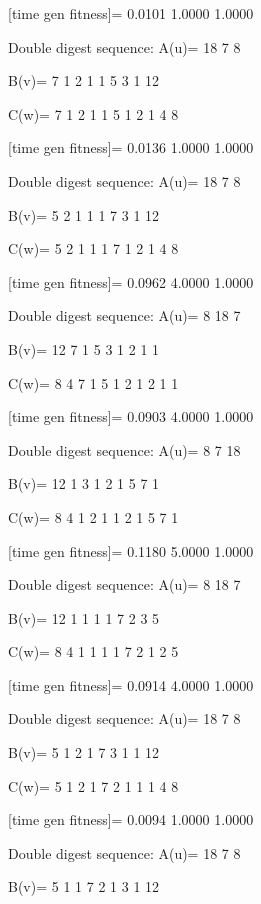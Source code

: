 [time gen fitness]=
    0.0101    1.0000    1.0000

Double digest sequence:
A(u)=
    18     7     8

B(v)=
     7     1     2     1     1     5     3     1    12

C(w)=
     7     1     2     1     1     5     1     2     1     4     8

[time gen fitness]=
    0.0136    1.0000    1.0000

Double digest sequence:
A(u)=
    18     7     8

B(v)=
     5     2     1     1     1     7     3     1    12

C(w)=
     5     2     1     1     1     7     1     2     1     4     8

[time gen fitness]=
    0.0962    4.0000    1.0000

Double digest sequence:
A(u)=
     8    18     7

B(v)=
    12     7     1     5     3     1     2     1     1

C(w)=
     8     4     7     1     5     1     2     1     2     1     1

[time gen fitness]=
    0.0903    4.0000    1.0000

Double digest sequence:
A(u)=
     8     7    18

B(v)=
    12     1     3     1     2     1     5     7     1

C(w)=
     8     4     1     2     1     1     2     1     5     7     1

[time gen fitness]=
    0.1180    5.0000    1.0000

Double digest sequence:
A(u)=
     8    18     7

B(v)=
    12     1     1     1     1     7     2     3     5

C(w)=
     8     4     1     1     1     1     7     2     1     2     5

[time gen fitness]=
    0.0914    4.0000    1.0000

Double digest sequence:
A(u)=
    18     7     8

B(v)=
     5     1     2     1     7     3     1     1    12

C(w)=
     5     1     2     1     7     2     1     1     1     4     8

[time gen fitness]=
    0.0094    1.0000    1.0000

Double digest sequence:
A(u)=
    18     7     8

B(v)=
     5     1     1     7     2     1     3     1    12

